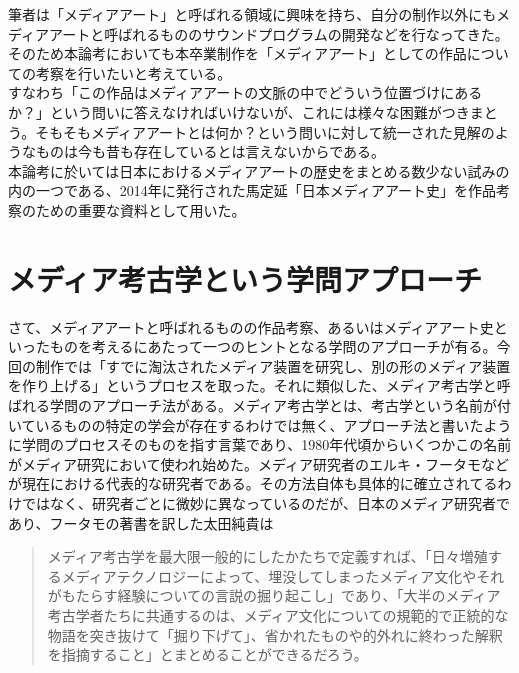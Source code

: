 \documentclass[a4paper,report]{jsbook}
\begin{document}
筆者は「メディアアート」と呼ばれる領域に興味を持ち、自分の制作以外にもメディアアートと呼ばれるもののサウンドプログラムの開発などを行なってきた。\\
そのため本論考においても本卒業制作を「メディアアート」としての作品についての考察を行いたいと考えている。\\
すなわち「この作品はメディアアートの文脈の中でどういう位置づけにあるか？」という問いに答えなければいけないが、これには様々な困難がつきまとう。そもそもメディアアートとは何か？という問いに対して統一された見解のようなものは今も昔も存在しているとは言えないからである。\\
本論考に於いては日本におけるメディアアートの歴史をまとめる数少ない試みの内の一つである、2014年に発行された馬定延「日本メディアアート史」を作品考察のための重要な資料として用いた。

\section{メディア考古学という学問アプローチ}\label{ux30e1ux30c7ux30a3ux30a2ux8003ux53e4ux5b66ux3068ux3044ux3046ux5b66ux554fux30a2ux30d7ux30edux30fcux30c1}

さて、メディアアートと呼ばれるものの作品考察、あるいはメディアアート史といったものを考えるにあたって一つのヒントとなる学問のアプローチが有る。今回の制作では「すでに淘汰されたメディア装置を研究し、別の形のメディア装置を作り上げる」というプロセスを取った。それに類似した、メディア考古学と呼ばれる学問のアプローチ法がある。メディア考古学とは、考古学という名前が付いているものの特定の学会が存在するわけでは無く、アプローチ法と書いたように学問のプロセスそのものを指す言葉であり、1980年代頃からいくつかこの名前がメディア研究において使われ始めた。メディア研究者のエルキ・フータモなどが現在における代表的な研究者である。その方法自体も具体的に確立されてるわけではなく、研究者ごとに微妙に異なっているのだが、日本のメディア研究者であり、フータモの著書を訳した太田純貴は

\begin{quote}
メディア考古学を最大限一般的にしたかたちで定義すれば、「日々増殖するメディアテクノロジーによって、埋没してしまったメディア文化やそれがもたらす経験についての言説の掘り起こし」であり、「大半のメディア考古学者たちに共通するのは、メディア文化についての規範的で正統的な物語を突き抜けて「掘り下げて」、省かれたものや的外れに終わった解釈を指摘すること」とまとめることができるだろう。
\end{quote}
\end{document}
